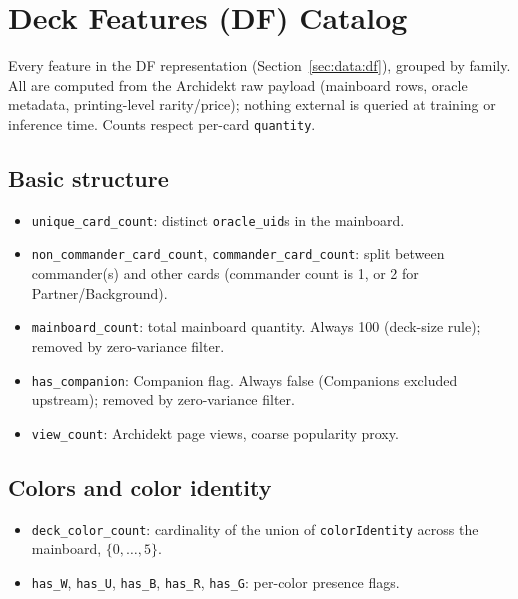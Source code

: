 \documentclass{article}
\begin{document}
\section{Deck Features (DF) Catalog}
\label{app:features}

\begingroup
\sloppy

Every feature in the DF representation (Section~\ref{sec:data:df}), grouped by family. All are computed from the Archidekt raw payload (mainboard rows, oracle metadata, printing-level rarity/price); nothing external is queried at training or inference time. Counts respect per-card \texttt{quantity}.

\subsection{Basic structure}
\label{app:features:basic}
\begin{itemize}\itemsep0pt
  \item \texttt{unique\_card\_count}: distinct \texttt{oracle\_uid}s in the mainboard.
  \item \texttt{non\_commander\_card\_count}, \texttt{commander\_card\_count}: split between commander(s) and other cards (commander count is 1, or 2 for Partner/Background).
  \item \texttt{mainboard\_count}: total mainboard quantity. Always 100 (deck-size rule); removed by zero-variance filter.
  \item \texttt{has\_companion}: Companion flag. Always false (Companions excluded upstream); removed by zero-variance filter.
  \item \texttt{view\_count}: Archidekt page views, coarse popularity proxy.
\end{itemize}

\subsection{Colors and color identity}
\label{app:features:colors}
\begin{itemize}\itemsep0pt
  \item \texttt{deck\_color\_count}: cardinality of the union of \texttt{colorIdentity} across the mainboard, $\{0,\dots,5\}$.
  \item \texttt{has\_W}, \texttt{has\_U}, \texttt{has\_B}, \texttt{has\_R}, \texttt{has\_G}: per-color presence flags.
\end{itemize}
\end{document}
